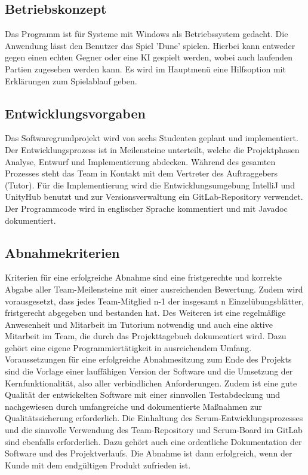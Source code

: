\documentclass[12pt]{article}
\newcounter{fa}
\newcounter{nfa}
\begin{document}
\newpage

\flushleft

\subsection{Betriebskonzept}

Das Programm ist für Systeme mit Windows als Betriebssystem gedacht. Die Anwendung lässt den Benutzer das Spiel 'Dune' spielen. Hierbei kann entweder gegen einen echten Gegner oder eine KI gespielt werden, wobei auch laufenden Partien zugesehen werden kann. Es wird im Hauptmenü eine Hilfsoption mit Erklärungen zum Spielablauf geben.

\subsection{Entwicklungsvorgaben}

Das Softwaregrundprojekt wird von sechs Studenten geplant und implementiert. Der Entwicklungsprozess ist in Meilensteine unterteilt, welche die Projektphasen Analyse, Entwurf und Implementierung abdecken. Während des gesamten Prozesses steht das Team in Kontakt mit dem Vertreter des Auftraggebers (Tutor). Für die Implementierung wird die Entwicklungsumgebung IntelliJ und UnityHub benutzt und zur Versionsverwaltung ein GitLab-Repository verwendet. Der Programmcode wird in englischer Sprache kommentiert und mit Javadoc dokumentiert.

\subsection{Abnahmekriterien}

Kriterien für eine erfolgreiche Abnahme sind eine fristgerechte und korrekte Abgabe aller Team-Meilensteine mit einer ausreichenden Bewertung. Zudem wird vorausgesetzt, dass jedes Team-Mitglied n-1 der insgesamt n Einzelübungsblätter, fristgerecht abgegeben und bestanden hat.
Des Weiteren ist eine regelmäßige Anwesenheit und Mitarbeit im Tutorium notwendig und auch eine aktive Mitarbeit im Team, die durch das Projekttagebuch dokumentiert wird. Dazu gehört eine eigene Programmiertätigkeit in ausreichendem Umfang.
Voraussetzungen für eine erfolgreiche Abnahmesitzung zum Ende des Projekts sind die Vorlage einer lauffähigen Version der Software und die Umsetzung der Kernfunktionalität, also aller verbindlichen Anforderungen. Zudem ist eine gute Qualität der entwickelten Software mit einer sinnvollen Testabdeckung und nachgewiesen durch umfangreiche und dokumentierte Maßnahmen zur Qualitätssicherung erforderlich. Die Einhaltung des Scrum-Entwicklungsprozesses und die sinnvolle Verwendung des Team-Repository und Scrum-Board im GitLab sind ebenfalls erforderlich. Dazu gehört auch eine ordentliche Dokumentation der Software und des Projektverlaufs.
Die Abnahme ist dann erfolgreich, wenn der Kunde mit dem endgültigen Produkt zufrieden ist.
\end{document}
